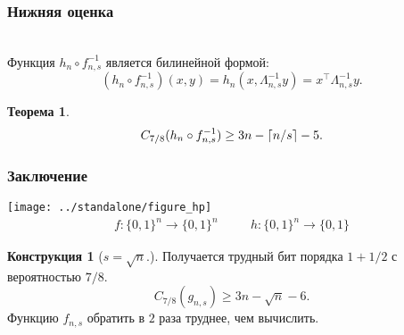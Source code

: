 \documentclass[mathserif,serif]{beamer} %
\newtheorem{thm}{Теорема}
\theoremstyle{definition}
\newtheorem{construction}{Конструкция}
\theoremstyle{remark}
\DeclarePairedDelimiter\ceil{\lceil}{\rceil}
\begin{document}
\begin{frame}
\frametitle{Нижняя оценка}
\pause
\\[1em]
Функция $h_n \circ f_{n, s}^{-1}$ является билинейной формой:
\[
(h_n \circ f_{n, s}^{-1})(x, y) = h_n(x, \Lambda_{n, s}^{-1}y) = x^\top \Lambda_{n, s}^{-1} y.
\]
\pause
\begin{thm}
\[
C_{7/8}(h_n \circ f_{n, s}^{-1}) \geq 3n - \ceil{n / s} - 5.
\]
\end{thm}
\end{frame}

\begin{frame}
  \frametitle{Заключение}
  {
    \centering
    \texttt{[image: ../standalone/figure\_hp]}
    \[
    \begin{aligned}
    f : \{0, 1\}^n \to \{0, 1\}^n
    & \quad &
    h : \{0, 1\}^n \to \{0, 1\}
    \end{aligned}
    \]
  }
  \begin{construction}[$s = \sqrt{n}$.]
  Получается трудный бит порядка $1 + 1/2$ с вероятностью $7/8$.
  \[
  C_{7/8}(g_{n, s}) \geq 3n - \sqrt{n} - 6.
  \]
  Функцию $f_{n, s}$ обратить в $2$ раза труднее, чем вычислить.
  \end{construction}
\end{frame}
\end{document}
